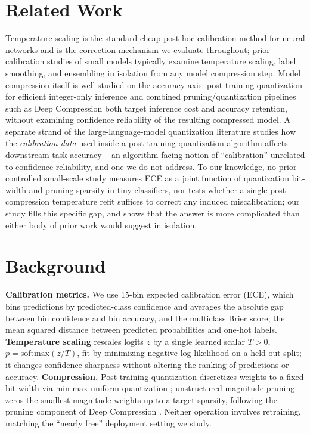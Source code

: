 \documentclass{article} %
\theoremstyle{plain}
\theoremstyle{definition}
\theoremstyle{remark}
\begin{document}
\section{Related Work}
\label{sec:related}
Temperature scaling \citep{guo2017onco} is the standard cheap post-hoc calibration method for neural networks and is the correction mechanism we evaluate throughout; prior calibration studies of small models typically examine temperature scaling, label smoothing, and ensembling in isolation from any model compression step. Model compression itself is well studied on the accuracy axis: post-training quantization for efficient integer-only inference \citep{jacob2017quantizationat} and combined pruning/quantization pipelines such as Deep Compression \citep{han2015deepcc} both target inference cost and accuracy retention, without examining confidence reliability of the resulting compressed model. A separate strand of the large-language-model quantization literature studies how the \emph{calibration data} used inside a post-training quantization algorithm affects downstream task accuracy -- an algorithm-facing notion of ``calibration'' unrelated to confidence reliability, and one we do not address. To our knowledge, no prior controlled small-scale study measures ECE as a joint function of quantization bit-width and pruning sparsity in tiny classifiers, nor tests whether a single post-compression temperature refit suffices to correct any induced miscalibration; our study fills this specific gap, and shows that the answer is more complicated than either body of prior work would suggest in isolation.

\section{Background}
\label{sec:background}
\textbf{Calibration metrics.} We use 15-bin expected calibration error (ECE), which bins predictions by predicted-class confidence and averages the absolute gap between bin confidence and bin accuracy, and the multiclass Brier score, the mean squared distance between predicted probabilities and one-hot labels. \textbf{Temperature scaling} \citep{guo2017onco} rescales logits $z$ by a single learned scalar $T>0$, $p = \mathrm{softmax}(z/T)$, fit by minimizing negative log-likelihood on a held-out split; it changes confidence sharpness without altering the ranking of predictions or accuracy. \textbf{Compression.} Post-training quantization discretizes weights to a fixed bit-width via min-max uniform quantization \citep{jacob2017quantizationat}; unstructured magnitude pruning zeros the smallest-magnitude weights up to a target sparsity, following the pruning component of Deep Compression \citep{han2015deepcc}. Neither operation involves retraining, matching the ``nearly free'' deployment setting we study.
\end{document}
